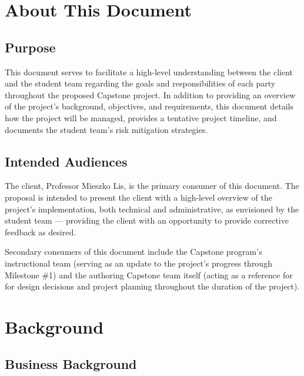\documentclass[10pt,letterpaper]{article}
\begin{document}
\section{About This Document}

\subsection{Purpose}

This document serves to facilitate a high-level understanding between the client and the student team 
regarding the goals and responsibilities of each party throughout the proposed Capstone project.
In addition to providing an overview of the project's background, objectives, and requirements, this 
document details how the project will be managed, provides a tentative project timeline, and documents the student team's risk mitigation strategies.

\subsection{Intended Audiences}

The client, Professor Mieszko Lis, is the primary consumer of this document. The proposal is intended to present the client with a high-level overview of the project's implementation, both technical and administrative, as envisioned by the student team --- providing the client with an opportunity to provide corrective feedback as desired.

Secondary consumers of this document include the Capstone program's instructional team (serving as an update to the project's progress through Milestone \#1) and the authoring Capstone team itself (acting as a reference for for design decisions and project planning throughout the duration of the project).



\section{Background}


\subsection{Business Background}

\end{document}
